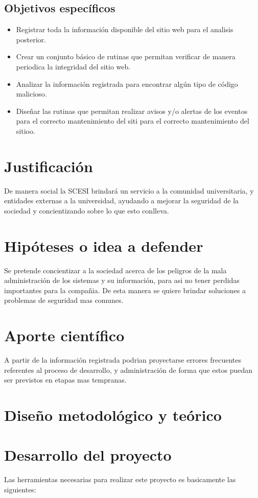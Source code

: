 \documentclass[letter,twoside,11pt]{article}
\begin{document}
\subsection{Objetivos específicos}
\begin{itemize}
\item Registrar toda la información disponible del sitio web para el analisis
    posterior.
\item Crear un conjunto básico de rutinas que permitan verificar de manera
    periodica la integridad del sitio web.
\item Analizar la información registrada para encontrar algún tipo de código
    malicioso.
\item Diseñar las rutinas que permitan realizar avisos y/o alertas de los
    eventos para el correcto mantenimiento del siti para el correcto
    mantenimiento del sitioo.
\end{itemize}

\section{Justificación}
De manera social la SCESI brindará un servicio a la comunidad universitaria, y
entidades externas a la universidad, ayudando a mejorar la seguridad de la
sociedad y concientizando sobre lo que esto conlleva.

\section{Hipóteses o idea a defender}
Se pretende concientizar a la sociedad acerca de los peligros de la mala
administración de los sistemas y su información, para asi no tener perdidas
importantes para la compañia.
De esta manera se quiere brindar soluciones a problemas de seguridad mas
comunes.

\section{Aporte científico}
A partir de la información registrada podrian proyectarse errores frecuentes
referentes al proceso de desarrollo, y administración de forma que estos puedan
ser previstos en etapas mas tempranas.

\section{Diseño metodológico y teórico}


\section{Desarrollo del proyecto}
Las herramientas necesarias para realizar este proyecto es basicamente las
siguientes:
\end{document}
